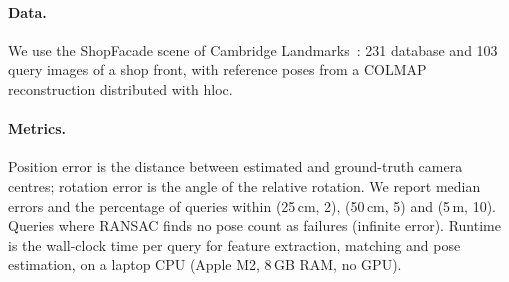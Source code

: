 \documentclass[11pt,a4paper]{article}
\begin{document}
\paragraph{Data.} We use the ShopFacade scene of Cambridge Landmarks~\cite{kendall2015posenet}:
231 database and 103 query images of a shop front, with reference poses from a COLMAP
reconstruction distributed with hloc.

\paragraph{Metrics.} Position error is the distance between estimated and ground-truth camera
centres; rotation error is the angle of the relative rotation. We report median errors and the
percentage of queries within (25\,cm, 2\textdegree), (50\,cm, 5\textdegree) and
(5\,m, 10\textdegree). Queries where RANSAC finds no pose count as failures (infinite error).
Runtime is the wall-clock time per query for feature extraction, matching and pose estimation,
on a laptop CPU (Apple M2, 8\,GB RAM, no GPU).




\end{document}
